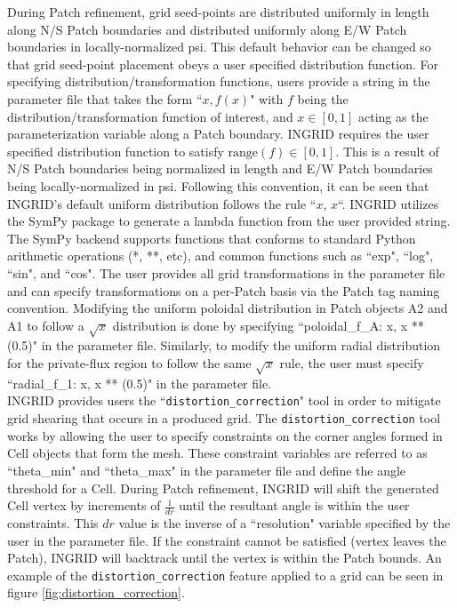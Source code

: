 During Patch refinement, grid seed-points are distributed uniformly in length along N/S Patch boundaries and distributed uniformly along E/W Patch boundaries in locally-normalized psi. This default behavior can be changed so that grid seed-point placement obeys a user specified distribution function. For specifying distribution/transformation functions, users provide a string in the parameter file that takes the form ``$x, f(x)$" with $f$ being the distribution/transformation function of interest, and $x \in [0, 1]$ acting as the parameterization variable along a Patch boundary. INGRID requires the user specified distribution function to satisfy $\text{range}(f) \in [0, 1]$. This is a result of N/S Patch boundaries being normalized in length and E/W Patch boundaries being locally-normalized in psi. Following this convention, it can be seen that INGRID's default uniform distribution follows the rule ``$x,\,x$``. INGRID utilizes the SymPy\cite{10.7717/peerj-cs.103} package to generate a lambda function from the user provided string.
The SymPy backend supports functions that conforms to standard Python arithmetic operations (*, **, etc), and common functions such as ``exp", ``log", ``sin", and ``cos". The user provides all grid transformations in the parameter file and can specify transformations on a per-Patch basis via the Patch tag naming convention. Modifying the uniform poloidal distribution in Patch objects A2 and A1 to follow a $\sqrt{x}$ distribution is done by specifying ``poloidal\_f\_A: x, x ** (0.5)" in the parameter file. Similarly, to modify the uniform radial distribution for the private-flux region to follow the same $\sqrt{x}$ rule, the user must specify ``radial\_f\_1: x, x ** (0.5)" in the parameter file.\\ \indent
INGRID provides users the ``\texttt{distortion\_correction}" tool in order to mitigate grid shearing that occurs in a produced grid. The \texttt{distortion\_correction} tool works by allowing the user to specify constraints on the corner angles formed in Cell objects that form the mesh. These constraint variables are referred to as ``theta\_min" and ``theta\_max" in the parameter file and define the angle threshold for a Cell. During Patch refinement, INGRID will shift the generated Cell vertex by increments of $\frac{1}{dr}$ until the resultant angle is within the user constraints. This $dr$ value is the inverse of a ``resolution" variable specified by the user in the parameter file. If the constraint cannot be satisfied (vertex leaves the Patch), INGRID will backtrack until the vertex is within the Patch bounds. An example of the \texttt{distortion\_correction} feature applied to a grid can be seen in figure \ref{fig:distortion_correction}.